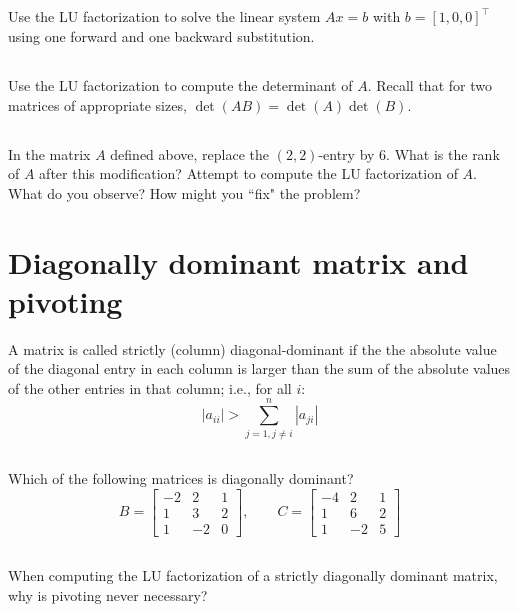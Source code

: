 \documentclass[11pt,letterpaper]{article}
\begin{document}
\subsection{}
Use the LU factorization to solve the linear system $Ax=b$ with
  $b=[1, 0, 0]^\top$ using one forward and one backward substitution.
  
\subsection{}\label{sec:3.1d}
Use the LU factorization to compute the determinant of
$A$. Recall that for two matrices of appropriate sizes,
$\det(AB)=\det(A)\det(B)$.
  
\subsection{}
In the matrix $A$ defined above, replace the $(2,2)$-entry by $6$.
What is the rank of $A$ after this modification?
Attempt to compute the LU factorization of $A$. 
What do you observe?
How might you ``fix" the problem?


\section{Diagonally dominant matrix and pivoting}
A matrix is called strictly (column) diagonal-dominant if the
 the absolute value of the diagonal entry in each column is larger than
 the sum of the absolute values of the other entries in that
 column; i.e., for all $i$:
 $$
 |a_{ii}|>\sum_{j=1, j\not=i}^n |a_{ji}|
 $$
 
\subsection{}
Which of the following matrices is diagonally dominant?
$$
 B={\begin{bmatrix}-2&2&1\\1&3&2\\1&-2&0\end{bmatrix}}, \qquad
 C={\begin{bmatrix}-4&2&1\\1&6&2\\1&-2&5\end{bmatrix}}
$$

\subsection{}
When computing the LU
 factorization of a strictly diagonally dominant matrix, why is
 pivoting never necessary? 
\end{document}
